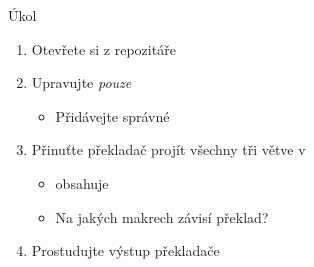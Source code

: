 \begin{frame}{Úkol}

  \begin{enumerate}
    \item Otevřete si  z repozitáře

    \item Upravujte \emph{pouze} 
    \begin{itemize}
      \item Přidávejte správné 
    \end{itemize}

    \item Přinuťte překladač projít všechny tři větve v 
    \begin{itemize}
      \item {} obsahuje 
      \item Na jakých makrech závisí překlad?
    \end{itemize}

    \item Prostudujte výstup překladače
  \end{enumerate}

\end{frame}

